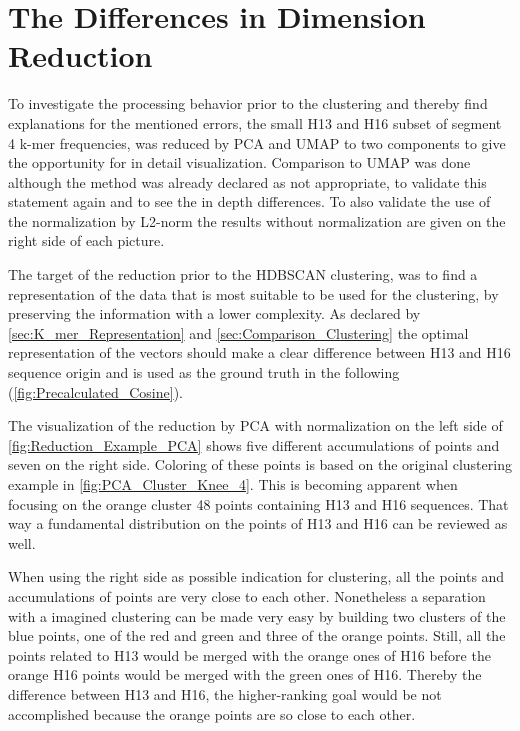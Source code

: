 \section{The Differences in Dimension Reduction} \label{sec:Dimension_Reduction}

To investigate the processing behavior prior to the clustering and thereby find explanations for the mentioned errors, the small H13 and H16 subset of segment 4 k-mer frequencies, was reduced by \gls{PCA} and \gls{UMAP} to two components to give the opportunity for in detail visualization. Comparison to \gls{UMAP} was done although the method was already declared as not appropriate, to validate this statement again and to see the in depth differences. %
To also validate the use of the normalization by L2-norm the results without normalization are given on the right side of each picture.

The target of the reduction prior to the \gls{HDBSCAN} clustering, was to find a representation of the data that is most suitable to be used for the clustering, by preserving the information with a lower complexity. As declared by \autoref{sec:K_mer_Representation} and \autoref{sec:Comparison_Clustering} the optimal representation of the vectors should make a clear difference between H13 and H16 sequence origin and is used as the ground truth in the following (\autoref{fig:Precalculated_Cosine}). 

The visualization of the reduction by \gls{PCA} with normalization on the left side of \autoref{fig:Reduction_Example_PCA} shows five different accumulations of points and seven on the right side. Coloring of these points is based on the original clustering example in \autoref{fig:PCA_Cluster_Knee_4}. This is becoming apparent when focusing on the orange cluster 48 points containing H13 and H16 sequences. That way a fundamental distribution on the points of H13 and H16 can be reviewed as well. 

When using the right side as possible indication for clustering, all the points and accumulations of points are very close to each other. Nonetheless a separation with a imagined clustering can be made very easy by building two clusters of the blue points, one of the red and green and three of the orange points. Still, all the points related to H13 would be merged with the orange ones of H16 before the orange H16 points would be merged with the green ones of H16. Thereby the difference between H13 and H16, the higher-ranking goal would be not accomplished because the orange points are so close to each other. 

